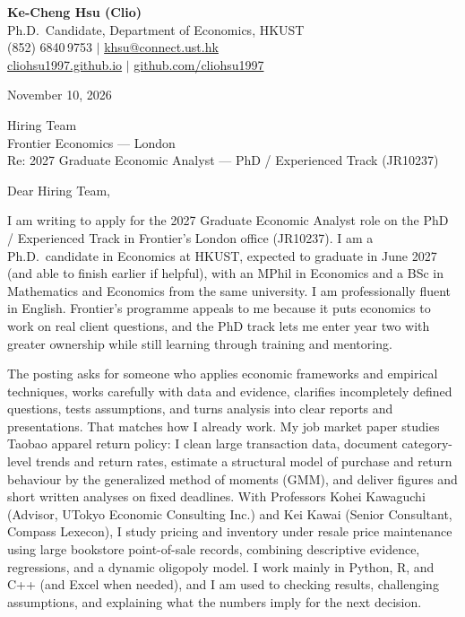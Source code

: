\documentclass[11pt,letterpaper]{article}
\begin{document}
\noindent
{\bfseries Ke-Cheng Hsu (Clio)}\\
Ph.D.\ Candidate, Department of Economics, HKUST\\
(852) 6840\,9753 \quad $|$ \quad \href{mailto:khsu@connect.ust.hk}{khsu@connect.ust.hk}\\
\href{https://cliohsu1997.github.io/}{cliohsu1997.github.io} \quad $|$ \quad \href{https://github.com/cliohsu1997}{github.com/cliohsu1997}

\vspace{0.7em}
\noindent
November 10, 2026

\vspace{0.35em}
\noindent
Hiring Team\\
Frontier Economics --- London\\
Re: 2027 Graduate Economic Analyst --- PhD / Experienced Track (JR10237)

\vspace{0.2em}
Dear Hiring Team,

I am writing to apply for the 2027 Graduate Economic Analyst role on the PhD / Experienced Track in Frontier's London office (JR10237). I am a Ph.D.\ candidate in Economics at HKUST, expected to graduate in June 2027 (and able to finish earlier if helpful), with an MPhil in Economics and a BSc in Mathematics and Economics from the same university. I am professionally fluent in English. Frontier's programme appeals to me because it puts economics to work on real client questions, and the PhD track lets me enter year two with greater ownership while still learning through training and mentoring.

The posting asks for someone who applies economic frameworks and empirical techniques, works carefully with data and evidence, clarifies incompletely defined questions, tests assumptions, and turns analysis into clear reports and presentations. That matches how I already work. My job market paper studies Taobao apparel return policy: I clean large transaction data, document category-level trends and return rates, estimate a structural model of purchase and return behaviour by the generalized method of moments (GMM), and deliver figures and short written analyses on fixed deadlines. With Professors Kohei Kawaguchi (Advisor, UTokyo Economic Consulting Inc.) and Kei Kawai (Senior Consultant, Compass Lexecon), I study pricing and inventory under resale price maintenance using large bookstore point-of-sale records, combining descriptive evidence, regressions, and a dynamic oligopoly model. I work mainly in Python, R, and C++ (and Excel when needed), and I am used to checking results, challenging assumptions, and explaining what the numbers imply for the next decision.
\end{document}
